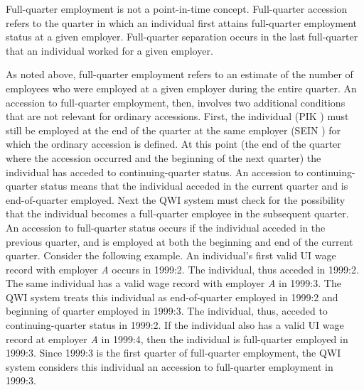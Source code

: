 Full-quarter employment is not a point-in-time concept. Full-quarter
accession refers to the quarter in which an individual first attains
full-quarter employment status at a given employer. Full-quarter separation
occurs in the last full-quarter that an individual worked for a given
employer.

As noted above, full-quarter employment refers to an estimate of the number
of employees who were employed at a given employer during the entire
quarter. An accession to full-quarter employment, then, involves two
additional conditions that are not relevant for ordinary accessions. First,
the individual (PIK%
) must still be employed at the end of the quarter at the same
employer (SEIN%
) for which the ordinary accession is defined. At this point
(the end of the quarter where the accession occurred and the beginning of
the next quarter) the individual has acceded to continuing-quarter status.
An accession to continuing-quarter status means that the individual acceded
in the current quarter and is end-of-quarter employed. Next the QWI system
must check for the possibility that the individual becomes a full-quarter
employee in the subsequent quarter. An accession to full-quarter status
occurs if the individual acceded in the previous quarter, and is employed at
both the beginning and end of the current quarter. Consider the following
example. An individual's first valid UI%
 wage record with employer \textit{A} occurs in 1999:2. The
individual, thus acceded in 1999:2. The same individual has a valid wage
record with employer \textit{A} in 1999:3. The QWI system treats this
individual as end-of-quarter employed in 1999:2 and beginning of quarter
employed in 1999:3. The individual, thus, acceded to continuing-quarter
status in 1999:2. If the individual also has a valid {UI} wage record at
employer \textit{A} in 1999:4, then the individual is full-quarter employed
in 1999:3. Since 1999:3 is the first quarter of full-quarter employment, the
QWI system considers this individual an accession to full-quarter employment
in 1999:3.

